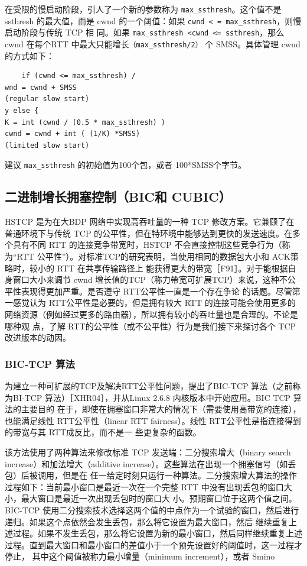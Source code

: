在受限的慢启动阶段，引人了一个新的参数称为 \verb|max_ssthresh|。这个值不是 ssthresh 的最大值，而是 cwnd 的一个阈值：如果 \verb|cwnd < = max_ssthresh|，则慢启动阶段与传统 TCP 相
同。如果 \verb|max_ssthresh <cwnd <= ssthresh|，那么 cwnd 在每个RTT 中最大只能增长\verb|（max_ssthresh/2）| 个 SMSS。具体管理 cwnd的方式如下：
\begin{verbatim}
    if (cwnd <= max_ssthresh) /
wnd = cwnd + SMSS
(regular slow start)
y else {
K = int (cwnd / (0.5 * max_ssthresh) )
cwnd = cwnd + int ( (1/K) *SMSS)
(limited slow start)
\end{verbatim}
建议 \verb|max_ssthresh| 的初始值为100个包，或者 100*SMSS个字节。

\subsection{二进制增长拥塞控制（BIC和 CUBIC）}
HSTCP 是为在大BDP 网络中实现高吞吐量的一种 TCP 修改方案。它兼顾了在普通环境下与传统 TCP 的公平性，但在特环境中能够达到更快的发送速度。在多个具有不同 RTT
的连接竞争带宽时，HSTCP 不会直接控制这些竞争行为（称为“RTT 公平性”）。对标准TCP的研究表明，当使用相同的数据包大小和 ACK策略时，较小的 RTT 在共享传输路径上
能获得更大的带宽［F91］。对于能根据自身窗口大小来调节 cwnd 增长值的TCP（称力帶宽可扩展TCP）来说，这种不公平性表现得更加严重。是否遵守 RTT公平性一直是一个存在争论
的话题。尽管第一感觉认为 RTT公平性是必要的，但是拥有较大 RTT 的连接可能会使用更多的网络资源（例如经过更多的路由器），所以拥有较小的吞吐量也是合理的。不论是哪种观
点，了解 RTT的公平性（或不公平性）行为是我们接下来探讨各个 TCP改进版本的动因。

\subsubsection{BIC-TCP 算法}
为建立一种可扩展的TCP及解决RTT公平性问题，提出了BIC-TCP 算法（之前称为BI-TCP 算法）［XHR04］，并从Linux 2.6.8 内核版本中开始应用。BIC TCP 算法的主要目的
在于，即使在拥塞窗口非常大的情况下（需要使用高带宽的连接），也能满足线性 RTT公平性（linear RTT fairness）。线性 RTT公平性是指连接得到的带宽与其 RTT成反比，而不是一
些更复杂的函数。

该方法使用了两种算法来修改标准 TCP 发送端：二分搜索增大（binary search increase）和加法增大（additive increase）。这些算法在出现一个拥塞信号（如丢包）后被调用，但是在
任一给定时刻只运行一种算法。二分搜索增大算法的操作过程如下：当前最小窗口是最近一次在一个完整 RTT 中没有出现丢包的窗口大小，最大窗口是最近一次出现丢包时的窗口大
小。预期窗口位于这两个值之间。BIC-TCP 使用二分搜索技术选择这两个值的中点作为一个试验的窗口，然后进行递归。如果这个点依然会发生丢包，那么将它设置为最大窗口，然后
继续重复上述过程。如果不发生丢包，那么将它设置为新的最小窗口，然后同样继续重复上述过程。直到最大窗口和最小窗口的差值小于一个预先设置好的阈值时，这一过程才停止，
其中这个阈值被称力最小增量（minimum increment），或者 Smino

